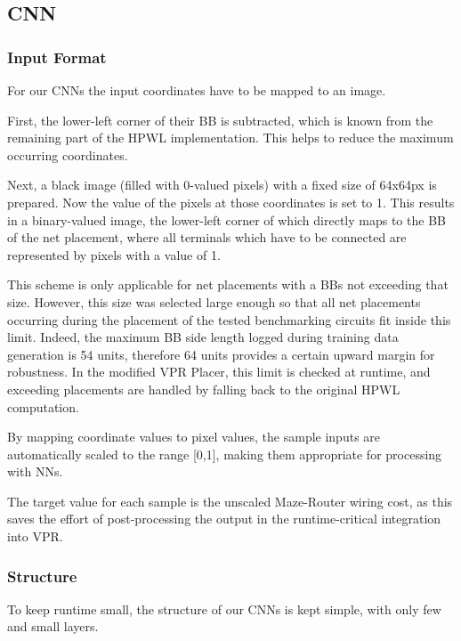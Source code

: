\subsection{\gls{CNN}}



\subsubsection{Input Format}

For our \glspl{CNN} the input coordinates have to be mapped to an image. 

First, the lower-left corner of their \gls{BB} is subtracted, which is known from the remaining part of the \gls{HPWL} implementation. This helps to reduce the maximum occurring coordinates.

Next, a black image (filled with 0-valued pixels) with a fixed size of 64x64px is prepared. Now the value of the pixels at those coordinates is set to 1. This results in a binary-valued image, the lower-left corner of which directly maps to the \gls{BB} of the net placement, where all terminals which have to be connected are represented by pixels with a value of 1.

This scheme is only applicable for net placements with a \glspl{BB} not exceeding that size. However, this size was selected large enough so that all net placements occurring during the placement of the tested benchmarking circuits fit inside this limit. Indeed, the maximum \gls{BB} side length logged during training data generation is 54 units, therefore 64 units provides a certain upward margin for robustness. In the modified \gls{VPR} Placer, this limit is checked at runtime, and exceeding placements are handled by falling back to the original \gls{HPWL} computation.

By mapping coordinate values to pixel values, the sample inputs are automatically scaled to the range [0,1], making them appropriate for processing with \glspl{NN}.

The target value for each sample is the unscaled Maze-Router wiring cost, as this saves the effort of post-processing the output in the runtime-critical integration into \gls{VPR}.\cite{TODO}

\subsubsection{Structure}\label{ch:cnn-design}

To keep runtime small, the structure of our \glspl{CNN} is kept simple, with only few and small layers.

